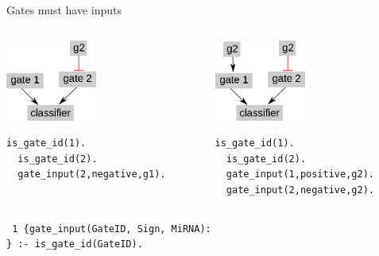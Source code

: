 \documentclass[10pt,dvipsnames]{beamer}
\begin{document}
\begin{frame}[fragile]{Gates must have inputs}
 \begin{columns}  
 \begin{column}{0.5\textwidth}
 \begin{center}\includegraphics[width=3cm]{constraints_01.png}\end{center}
 \color{my_example_color}
 \begin{Verbatim}[fontsize=\small]
  is_gate_id(1).
  is_gate_id(2).
  gate_input(2,negative,g1).
 \end{Verbatim}
 \end{column}
 \begin{column}{0.5\textwidth}
 \begin{center}\includegraphics[width=3cm]{constraints_02.png}\end{center}
 \color{my_example_color}
 \begin{Verbatim}[fontsize=\small]
  is_gate_id(1).
  is_gate_id(2).
  gate_input(1,positive,g2).
  gate_input(2,negative,g2).
 \end{Verbatim}
 \end{column}
 \end{columns}
 \vspace{1cm}
 \texttt{
 1 \{gate\_input(GateID, Sign, MiRNA):\\
  \} :- is\_gate\_id(GateID).
 }
 
\end{frame}
\end{document}
